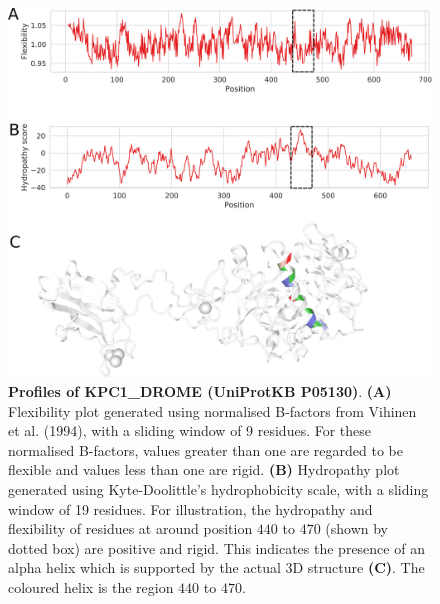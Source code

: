 \begin{figure}[htbp!]
\center
\includegraphics[width=1\textwidth]{chapters/Introduction/Figures/flex_and_hydrop.png}
\caption[Profiles of KPC1\_DROME (UniProtKB P05130).]{\textbf{Profiles of KPC1\_DROME (UniProtKB P05130)}. 
\textbf{(A)} Flexibility plot generated using normalised B-factors from Vihinen et al. (1994), with a sliding window of 9 residues. For these normalised B-factors, values greater than one are regarded to be flexible and values less than one are rigid. \textbf{(B)} Hydropathy plot generated using Kyte-Doolittle's hydrophobicity scale, with a sliding window of 19 residues. For illustration, the hydropathy and flexibility of residues at around position $440$ to $470$ (shown by dotted box) are positive and rigid. This indicates the presence of an alpha helix which is supported by the actual 3D structure \textbf{(C)}. The coloured helix is the region $440$ to $470$.  }%
\label{fig:hydrophobicity_flexibility_plot}
\end{figure}




